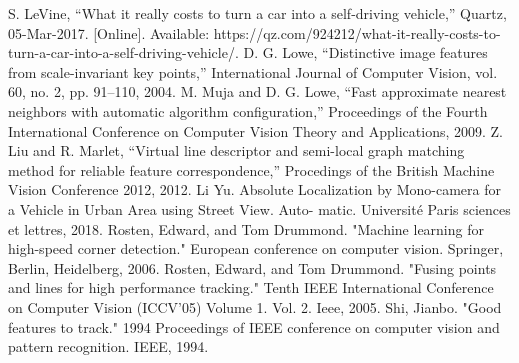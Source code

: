 \documentclass[conference]{IEEEtran}
\begin{document}
\begin{thebibliography}{00}
 S. LeVine, “What it really costs to turn a car into a self-driving vehicle,” Quartz, 05-Mar-2017. [Online]. Available: https://qz.com/924212/what-it-really-costs-to-turn-a-car-into-a-self-driving-vehicle/. 
 D. G. Lowe, “Distinctive image features from scale-invariant key points,” International Journal of Computer Vision, vol. 60, no. 2, pp. 91–110, 2004. 
 M. Muja and D. G. Lowe, “Fast approximate nearest neighbors with automatic algorithm configuration,” Proceedings of the Fourth International Conference on Computer Vision Theory and Applications, 2009. 
 Z. Liu and R. Marlet, “Virtual line descriptor and semi-local graph matching method for reliable feature correspondence,” Procedings of the British Machine Vision Conference 2012, 2012. 
 {Li Yu. Absolute Localization by Mono-camera for a Vehicle in Urban Area using Street View. Auto-
matic. Université Paris sciences et lettres, 2018.}
 Rosten, Edward, and Tom Drummond. "Machine learning for high-speed corner detection." European conference on computer vision. Springer, Berlin, Heidelberg, 2006.
 Rosten, Edward, and Tom Drummond. "Fusing points and lines for high performance tracking." Tenth IEEE International Conference on Computer Vision (ICCV'05) Volume 1. Vol. 2. Ieee, 2005.
 Shi, Jianbo. "Good features to track." 1994 Proceedings of IEEE conference on computer vision and pattern recognition. IEEE, 1994.

\end{thebibliography}
\end{document}
